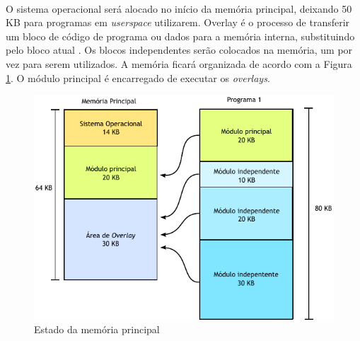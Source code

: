 \\
O sistema operacional será alocado no início da memória principal, deixando
50 KB para programas em \textsl{userspace} utilizarem.  Overlay é o processo
de transferir um bloco de código de programa ou dados para a memória interna,
substituindo pelo bloco atual \cite{OxfordDictionary}.  Os blocos independentes
serão colocados na memória, um por vez para serem utilizados.  A memória
ficará organizada de acordo com a Figura \ref{OverlayPDF}.  O módulo principal
é encarregado de executar os \textsl{overlays}.

\begin{figure}[!ht]
  \centering
	\includegraphics[scale=1]{img/overlay.pdf}
  \caption{Estado da memória principal \label{OverlayPDF}}
\end{figure}

